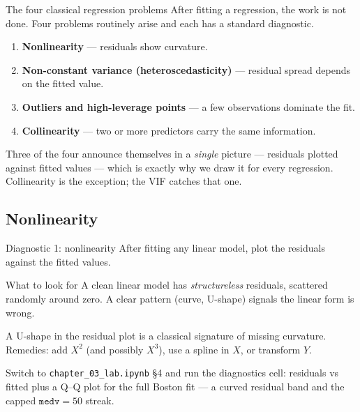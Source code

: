 \documentclass[aspectratio=169,11pt]{beamer}
\begin{document}
\begin{frame}{The four classical regression problems}
  After fitting a regression, the work is not done. Four problems
  routinely arise and each has a standard diagnostic.
  \begin{enumerate}
    \item \textbf{Nonlinearity} --- residuals show curvature.
    \item \textbf{Non-constant variance (heteroscedasticity)} --- residual
          spread depends on the fitted value.
    \item \textbf{Outliers and high-leverage points} --- a few
          observations dominate the fit.
    \item \textbf{Collinearity} --- two or more predictors carry the
          same information.
  \end{enumerate}
  \begin{takeaway}
    Three of the four announce themselves in a \emph{single} picture ---
    residuals plotted against fitted values --- which is exactly why we
    draw it for every regression. Collinearity is the exception; the
    VIF catches that one.
  \end{takeaway}
\end{frame}

\subsection{Nonlinearity}

\begin{frame}{Diagnostic 1: nonlinearity}
  After fitting any linear model, plot the residuals against the
  fitted values.
  \begin{block}{What to look for}
    A clean linear model has \emph{structureless} residuals, scattered
    randomly around zero. A clear pattern (curve, U-shape) signals
    the linear form is wrong.
  \end{block}
  \begin{takeaway}
    A U-shape in the residual plot is a classical signature of missing
    curvature. Remedies: add $X^2$ (and possibly $X^3$), use a spline
    in $X$, or transform $Y$.
  \end{takeaway}
  \begin{labnote}
    Switch to \texttt{chapter\_03\_lab.ipynb} \S4 and run the diagnostics
    cell: residuals vs fitted plus a Q--Q plot for the full Boston fit ---
    a curved residual band and the capped $\texttt{medv}=50$ streak.
  \end{labnote}
\end{frame}
\end{document}
